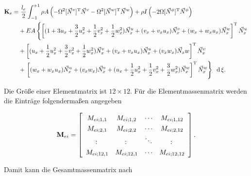 	\begin{equation}\label{equ:Steifigkeitsmatrix}
	\begin{aligned}
	\mathbf{K}_{e} = & \ \dfrac{l_{e}}{2} \int_{-1}^{+1} \rho A\left( -\Omega^{2}[\vec{N}^{v}]^{\mathrm{T}}\vec{N}^{v} - \Omega^{2}[\vec{N}^{w}]^{\mathrm{T}}\vec{N}^{w}\right) + \rho I \left( -2\Omega[\vec{N}^{\phi}]^{\mathrm{T}}\vec{N}^{\phi}\right) \\
	& + EA \left\lbrace  \left[ (1+3u_{x}+\dfrac{3}{2}u_{x}^{2}+\dfrac{1}{2}v_{x}^{2}+\dfrac{1}{2}w_{x}^{2})\vec{N}^{u}_{x} + (v_{x}+v_{x}u_{x})\vec{N}^{v}_{x} + (w_{x}+w_{x}u_{x})\vec{N}^{w}_{x}\right]^{\mathrm{T}}\vec{N}^{u}_{x} \right. \\
	& + \left[ (u_{x}+\dfrac{1}{2}u_{x}^{2}+\dfrac{3}{2}v_{x}^{2}+\dfrac{1}{2}w_{x}^{2})\vec{N}_{x}^{v} + (v_{x}+v_{x}u_{x})\vec{N}_{x}^{u} + (v_{x}w_{x})\vec{N}_{x}w \right]^{\mathrm{T}}\vec{N}_{x}^{v}\\
	& + \left. \left[ (w_{x}+w_{x}u_{x})\vec{N}_{x}^{u} + (v_{x}w_{x})\vec{N}_{x}^{v} + (u_{x}+\dfrac{1}{2}u_{x}^{2}+\dfrac{1}{2}v_{x}^{2}+\dfrac{3}{2}w_{x}^{2})\vec{N}_{x}^{w} \right]^{\mathrm{T}}\vec{N}_{x}^{w} \right\rbrace  \ \: \mathrm{d}\, \xi.
	\end{aligned}
	\end{equation}
	
	Die Größe einer Elementmatrix ist $ 12\times12 $. Für die Elementmassenmatrix werden die Einträge folgendermaßen angegeben
	
	\begin{equation}\label{equ:I.ten-Massenmatrix}
	\renewcommand{\arraystretch}{1.3}
	\mathbf{M}_{ei}=
	\left[ 
	\begin{array}{cccc}
	M_{ei;1,1} & M_{ei;1,2} & \cdots & M_{ei;1,12}\\
	M_{ei;2,1} & M_{ei;2,2} & \cdots & M_{ei;2,12}\\
	\colon     & \colon     & \ddots & \colon\\
	M_{ei;12,1}& M_{ei;12,1}& \cdots & M_{ei;12,12}
	\end{array}
	\right] .
	\end{equation}
	
	Damit kann die Gesamtmassenmatrix nach
	
